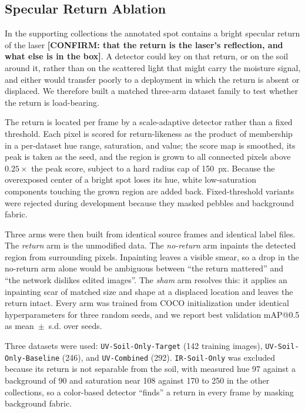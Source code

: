 ﻿\documentclass[journal]{IEEEtran}
\begin{document}
\subsection{Specular Return Ablation}
\label{sec:ablation-method}
In the supporting collections the annotated spot contains a bright specular return of the laser \textbf{[CONFIRM: that the return is the laser's reflection, and what else is in the box]}. A detector could key on that return, or on the soil around it, rather than on the scattered light that might carry the moisture signal, and either would transfer poorly to a deployment in which the return is absent or displaced. We therefore built a matched three-arm dataset family to test whether the return is load-bearing.

The return is located per frame by a scale-adaptive detector rather than a fixed threshold. Each pixel is scored for return-likeness as the product of membership in a per-dataset hue range, saturation, and value; the score map is smoothed, its peak is taken as the seed, and the region is grown to all connected pixels above $0.25\times$ the peak score, subject to a hard radius cap of 150~px. Because the overexposed center of a bright spot loses its hue, white low-saturation components touching the grown region are added back. Fixed-threshold variants were rejected during development because they masked pebbles and background fabric.

Three arms were then built from identical source frames and identical label files. The \emph{return} arm is the unmodified data. The \emph{no-return} arm inpaints the detected region from surrounding pixels. Inpainting leaves a visible smear, so a drop in the no-return arm alone would be ambiguous between ``the return mattered'' and ``the network dislikes edited images''. The \emph{sham} arm resolves this: it applies an inpainting scar of matched size and shape at a displaced location and leaves the return intact. Every arm was trained from COCO initialization under identical hyperparameters for three random seeds, and we report best validation mAP@0.5 as mean~$\pm$~s.d. over seeds.

Three datasets were used: \texttt{UV-Soil-Only-Target} (142 training images), \texttt{UV-Soil-Only-Baseline} (246), and \texttt{UV-Combined} (292). \texttt{IR-Soil-Only} was excluded because its return is not separable from the soil, with measured hue 97 against a background of 90 and saturation near 108 against 170 to 250 in the other collections, so a color-based detector ``finds'' a return in every frame by masking background fabric.
\end{document}
